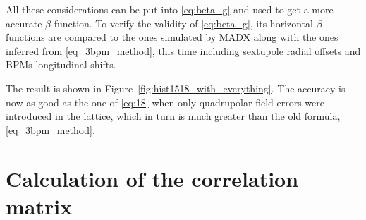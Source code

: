 All these considerations can be put into \eqref{eq:beta_g} and used to get a more accurate
$ \beta $ function.
To verify the validity of \eqref{eq:beta_g}, its horizontal $\beta$-functions are compared to the
ones simulated by MADX along with the ones inferred from \eqref{eq_3bpm_method}, this time including
sextupole radial offsets and BPMs longitudinal shifts.

The result is shown in Figure~\ref{fig:hist1518_with_everything}. The accuracy is now as good as the one of \eqref{eq:18}  when only quadrupolar field errors were introduced in the
lattice, which in turn is much greater than the old formula, \eqref{eq_3bpm_method}.

\section{Calculation of the correlation matrix}
\label{sec_corr_matr}

